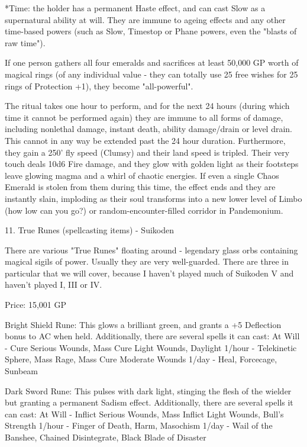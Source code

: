 \begin{multicols}{2}
*Time: the holder has a permanent Haste effect, and can cast Slow as a supernatural ability at will. They are immune to ageing effects and any other time-based powers (such as Slow, Timestop or Phane powers, even the "blasts of raw time").

If one person gathers all four emeralds and sacrifices at least 50,000 GP worth of magical rings (of any individual value - they can totally use 25 free wishes for 25 rings of Protection +1), they become "all-powerful".

The ritual takes one hour to perform, and for the next 24 hours (during which time it cannot be performed again) they are immune to all forms of damage, including nonlethal damage, instant death, ability damage/drain or level drain. This cannot in any way be extended past the 24 hour duration. Furthermore, they gain a 250' fly speed (Clumsy) and their land speed is tripled. Their very touch deals 10d6 Fire damage, and they glow with golden light as their footsteps leave glowing magma and a whirl of chaotic energies. If even a single Chaos Emerald is stolen from them during this time, the effect ends and they are instantly slain, imploding as their soul transforms into a new lower level of Limbo (how low can you go?) or random-encounter-filled corridor in Pandemonium. 



11. True Runes (spellcasting items) - Suikoden

There are various "True Runes" floating around - legendary glass orbs containing magical sigils of power. Usually they are very well-guarded. There are three in particular that we will cover, because I haven't played much of Suikoden V and haven't played I, III or IV.

Price: 15,001 GP

Bright Shield Rune: This glows a brilliant green, and grants a +5 Deflection bonus to AC when held. Additionally, there are several spells it can cast:
At Will - Cure Serious Wounds, Mass Cure Light Wounds, Daylight
1/hour - Telekinetic Sphere, Mass Rage, Mass Cure Moderate Wounds
1/day - Heal, Forcecage, Sunbeam

Dark Sword Rune: This pulses with dark light, stinging the flesh of the wielder but granting a permanent Sadism effect. Additionally, there are several spells it can cast:
At Will - Inflict Serious Wounds, Mass Inflict Light Wounds, Bull's Strength
1/hour - Finger of Death, Harm, Masochism
1/day - Wail of the Banshee, Chained Disintegrate, Black Blade of Disaster


\end{multicols}
